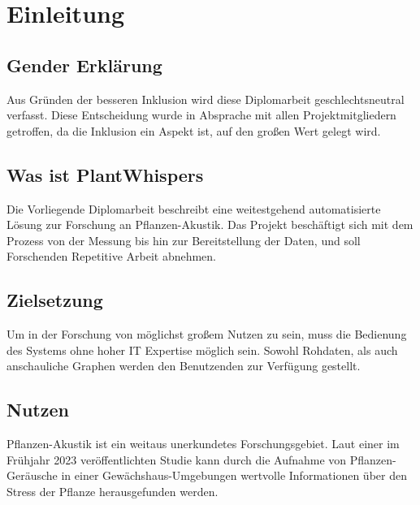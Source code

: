 \chapter{Einleitung} 

\section{Gender Erklärung}
Aus Gründen der besseren Inklusion wird diese Diplomarbeit geschlechtsneutral verfasst.
Diese Entscheidung wurde in Absprache mit allen Projektmitgliedern getroffen, da die Inklusion ein Aspekt ist, auf den großen Wert gelegt wird.

\section{Was ist PlantWhispers}
Die Vorliegende Diplomarbeit beschreibt eine weitestgehend automatisierte Lösung zur Forschung an Pflanzen-Akustik. Das Projekt beschäftigt sich mit dem Prozess von der Messung bis hin zur Bereitstellung der Daten, und soll Forschenden Repetitive Arbeit abnehmen.

\section{Zielsetzung}
Um in der Forschung von möglichst großem Nutzen zu sein, muss die Bedienung des Systems ohne hoher IT Expertise möglich sein. Sowohl Rohdaten, als auch anschauliche Graphen werden den Benutzenden zur Verfügung gestellt.

\section{Nutzen}
Pflanzen-Akustik ist ein weitaus unerkundetes Forschungsgebiet. Laut einer im Frühjahr 2023 veröffentlichten Studie \cite{Cell_Sounds_emitted_by_plants} kann durch die Aufnahme von Pflanzen-Geräusche in einer Gewächshaus-Umgebungen wertvolle Informationen über den Stress der Pflanze herausgefunden werden.



